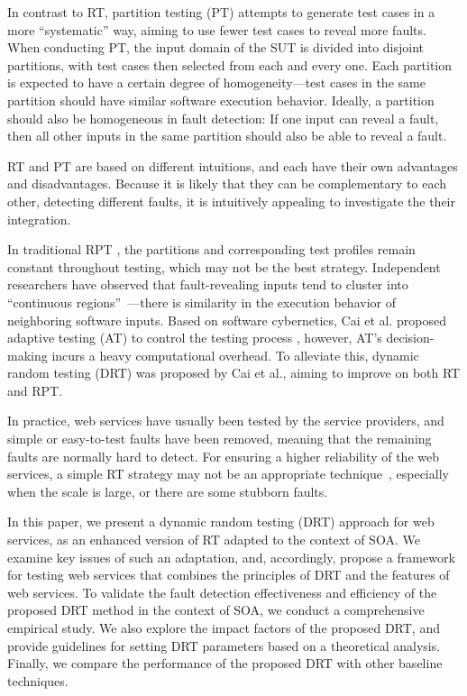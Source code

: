 \documentclass[10pt,journal,compsoc]{IEEEtran}
\begin{document}
In contrast to RT, partition testing (PT) attempts to generate test cases in a more ``systematic'' way, aiming to use fewer test cases to reveal more faults.
When conducting PT, the input domain of the SUT is divided into disjoint partitions, with test cases then selected from each and every one.
Each partition is expected to have a certain degree of homogeneity---test cases in the same partition should have similar software execution behavior.
Ideally, a partition should also be homogeneous in fault detection:
If one input can reveal a fault, then all other inputs in the same partition should also be able to reveal a fault.

RT and PT are based on different intuitions, and each have their own advantages and disadvantages.
Because it is likely that they can be complementary to each other, detecting different faults, it is intuitively appealing to investigate the their integration.

In traditional RPT \cite{cai2009random}, the partitions and corresponding test profiles remain constant throughout testing, which may not be the best strategy.
Independent researchers have observed that fault-revealing inputs tend to cluster into ``continuous regions''~\cite{Ammann88, Finelli91}---there is similarity in the execution behavior of neighboring software inputs.
Based on software cybernetics, Cai et al. proposed adaptive testing (AT) to control the testing process \cite{cai2004optimal}, however, AT's decision-making incurs a heavy computational overhead. To alleviate this, dynamic random testing (DRT) \cite{cai2009random} was proposed by Cai et al., aiming to improve on both RT and RPT.

In practice, web services have usually been tested by the service providers, and simple or easy-to-test faults have been removed, meaning that the remaining faults are normally hard to detect.
For ensuring a higher reliability of the web services, a simple RT strategy may not be an appropriate technique~\cite{li2014two}, especially when the scale is large, or there are some stubborn faults.

In this paper, we present a dynamic random testing (DRT) approach for web services, as an enhanced version of RT adapted to the context of SOA.
We examine key issues of such an adaptation, and, accordingly, propose a framework for testing web services that combines the principles of DRT \cite{cai2009random} and the features of web services. To validate the fault detection effectiveness and efficiency of the proposed DRT method in the context of SOA, we conduct a comprehensive empirical study. We also explore the impact factors of the proposed DRT, and provide guidelines for setting DRT parameters based on a theoretical analysis. Finally, we compare the performance of the proposed DRT with other baseline techniques.
\end{document}
